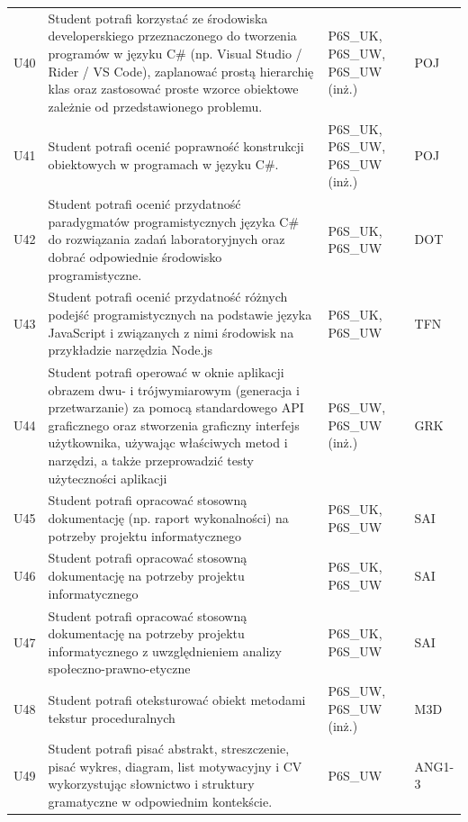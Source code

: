 \documentclass[12pt,a4paper]{article}
\begin{document}
{\begin{longtable}{m{1cm}m{8.8cm}m{2.1cm}m{2.5cm}}
\rowcolor{tableRowAlt} U40 & Student potrafi korzystać ze środowiska developerskiego przeznaczonego do tworzenia programów w języku C\# (np. Visual Studio / Rider / VS Code), zaplanować prostą hierarchię klas oraz zastosować proste wzorce obiektowe zależnie od przedstawionego problemu. & {\scriptsize P6S\_UK, P6S\_UW, P6S\_UW {\scriptsize (inż.)}} & {\scriptsize POJ} \\
\rowcolor{tableRowLight} U41 & Student potrafi ocenić poprawność konstrukcji obiektowych w programach w języku C\#. & {\scriptsize P6S\_UK, P6S\_UW, P6S\_UW {\scriptsize (inż.)}} & {\scriptsize POJ} \\
\rowcolor{tableRowAlt} U42 & Student potrafi ocenić przydatność paradygmatów programistycznych języka C\# do rozwiązania zadań laboratoryjnych oraz dobrać odpowiednie środowisko programistyczne. & {\scriptsize P6S\_UK, P6S\_UW} & {\scriptsize DOT} \\
\rowcolor{tableRowLight} U43 & Student potrafi ocenić przydatność różnych podejść programistycznych na podstawie języka JavaScript i związanych z nimi środowisk na przykładzie narzędzia Node.js & {\scriptsize P6S\_UK, P6S\_UW} & {\scriptsize TFN} \\
\rowcolor{tableRowAlt} U44 & Student potrafi operować w oknie aplikacji obrazem dwu- i trójwymiarowym (generacja i przetwarzanie) za pomocą standardowego API graficznego oraz stworzenia graficzny interfejs użytkownika, używając właściwych metod i narzędzi, a także przeprowadzić testy użyteczności aplikacji & {\scriptsize P6S\_UW, P6S\_UW {\scriptsize (inż.)}} & {\scriptsize GRK} \\
\rowcolor{tableRowLight} U45 & Student potrafi opracować stosowną dokumentację (np. raport wykonalności) na potrzeby projektu informatycznego & {\scriptsize P6S\_UK, P6S\_UW} & {\scriptsize SAI} \\
\rowcolor{tableRowAlt} U46 & Student potrafi opracować stosowną dokumentację na potrzeby projektu informatycznego & {\scriptsize P6S\_UK, P6S\_UW} & {\scriptsize SAI} \\
\rowcolor{tableRowLight} U47 & Student potrafi opracować stosowną dokumentację na potrzeby projektu informatycznego z uwzględnieniem analizy społeczno-prawno-etyczne & {\scriptsize P6S\_UK, P6S\_UW} & {\scriptsize SAI} \\
\rowcolor{tableRowAlt} U48 & Student potrafi oteksturować obiekt metodami tekstur proceduralnych & {\scriptsize P6S\_UW, P6S\_UW {\scriptsize (inż.)}} & {\scriptsize M3D} \\
\rowcolor{tableRowLight} U49 & Student potrafi pisać abstrakt, streszczenie, pisać wykres, diagram, list motywacyjny i CV wykorzystując słownictwo i struktury gramatyczne w odpowiednim kontekście. & {\scriptsize P6S\_UW} & {\scriptsize ANG1-3} \\

\end{longtable}}
\end{document}
